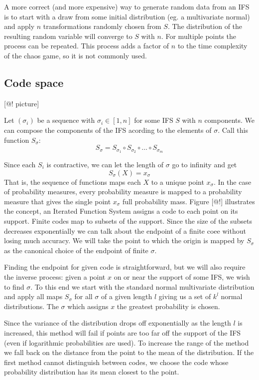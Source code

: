 \documentclass[10pt]{article}
\theoremstyle{definition}
\begin{document}
A more correct (and more expensive) way to generate random data from an IFS is to start with a draw from some initial distribution (eg. a multivariate normal) and apply $n$ transformations randomly chosen from $S$. The distribution of the resulting random variable will converge to $S$ with $n$. For multiple points the process can be repeated. This process adds a factor of $n$ to the time complexity of the chaos game, so it is not commonly used. 

\subsection{Code space}
\label{sec:code-space}
[@! picture]

Let $(\sigma_i)$ be a sequence with $\sigma_i \in [1, n]$ for some IFS $S$ with $n$ components. We can compose the components of the IFS acording to the elements of $\sigma$. Call this function $S_\sigma$:
\[
S_\sigma = S_{\sigma_1} \circ S_{\sigma_2} \circ \ldots \circ S_{\sigma_m}
\]

Since each $S_i$ is contractive, we can let the length of $\sigma$ go to infinity and get 
\[
S_\sigma(X) = x_\sigma  
\] 
That is, the sequence of functions maps each $X$ to a unique point $x_\sigma$. In the case of probability measures, every probability measure is mapped to a probability measure that gives the single point $x_\sigma$ full probability mass. Figure [@!] illustrates the concept, an Iterated Function System assigns a code to each point on its support. Finite codes map to subsets of the support. Since the size of the subsets decreases exponentially we can talk about the endpoint of a finite coee without losing much accuracy. We will take the point to which the origin is mapped by $S_\sigma$ as the canonical choice of the endpoint of finite $\sigma$.

Finding the endpoint for given code is straightforward, but we will also require the inverse process: given a point $x$ on or near the support of some IFS, we wish to find $\sigma$. To this end we start with the standard normal multivariate distribution and apply all maps $S_\sigma$ for all $\sigma$ of a given length $l$ giving us a set of $k^l$ normal distributions. The $\sigma$ which assigns $x$ the greatest probability is chosen.

Since the variance of the distribution drops off exponentially as the length $l$ is increased, this method will fail if points are too far off the support of the IFS (even if logarithmic probabilities are used). To increase the range of the method we fall back on the distance from the point to the mean of the distribution. If the first method cannot distinguish between codes, we choose the code whose probability distribution has its mean closest to the point.
\end{document}
